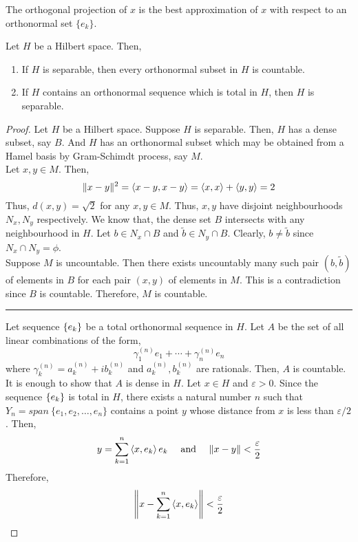 \begin{commentary}
\begin{definition}
	The orthogonal projection of $x$ is the best approximation of $x$ with respect to an orthonormal set $\{e_k\}$.
\end{definition}
\end{commentary}

\begin{theorem}
	Let $H$ be a Hilbert space.
	Then,
	\begin{enumerate}
		\item If $H$ is separable, then every orthonormal subset in $H$ is countable.
		\item If $H$ contains an orthonormal sequence which is total in $H$, then $H$ is separable.
	\end{enumerate}
\end{theorem}
\begin{proof}
	Let $H$ be a Hilbert space.
	Suppose $H$ is separable.
	Then, $H$ has a dense subset, say $B$.
	And $H$ has an orthonormal subset which may be obtained from a Hamel basis by Gram-Schimdt process, say $M$.\\
	
	Let $x,y \in M$.
	Then,
	\[ \|x-y\|^2 = \left\langle x-y,x-y \right\rangle = \left\langle x,x \right\rangle + \left\langle y,y \right\rangle = 2 \]
	Thus, $d(x,y) = \sqrt{2}$ for any $x,y \in M$.
	Thus, $x,y$ have disjoint neighbourhoods $N_x,N_y$ respectively.
	We know that, the dense set $B$ intersects with any neighbourhood in $H$.
	Let $b \in N_x \cap B$ and $\tilde{b} \in N_y \cap B$.
	Clearly, $b \ne \tilde{b}$ since $N_x \cap N_y = \phi$.\\

	Suppose $M$ is uncountable.
	Then there exists uncountably many such pair $(b,\tilde{b})$ of elements in $B$ for each pair $(x,y)$ of elements in $M$.
	This is a contradiction since $B$ is countable.
	Therefore, $M$ is countable.\\

	\hrule \vspace{1em}

	Let sequence $\left\{e_k\right\}$ be a total orthonormal sequence in $H$.
	Let $A$ be the set of all linear combinations of the form,
	\[ \gamma_1^{(n)}e_1 + \dotsb + \gamma_n^{(n)}e_n  \]
	where $\gamma_k^{(n)} = a_k^{(n)} + ib_k^{(n)}$ and $a_k^{(n)},b_k^{(n)}$ are rationals.
	Then, $A$ is countable.\\

	It is enough to show that $A$ is dense in $H$.
	Let $x \in H$ and $\varepsilon > 0$.
	Since the sequence $\left\{e_k\right\}$ is total in $H$, there exists a natural number $n$ such that $Y_n = span\ \{e_1,e_2,\dots,e_n\}$ contains a point $y$ whose distance from $x$ is less than $\varepsilon/2$.
	Then, 
	\[ y = \sum_{k=1}^n \left\langle x,e_k \right\rangle e_k \quad \text{ and } \quad \| x-y \| < \frac{\varepsilon}{2} \]
	Therefore,
	\[ \left\| x - \sum_{k=1}^n \left\langle x,e_k \right\rangle \right\| < \frac{\varepsilon}{2} \]
\end{proof}

